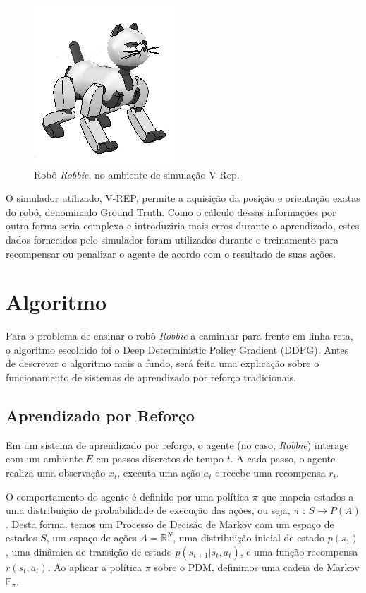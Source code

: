 \documentclass[twoside,conference,a4paper]{IEEEtran}
\begin{document}
\begin{figure}[ht!]
  \centering
  \includegraphics[width=0.5\hsize]{figuras/robbie.png}
  \caption{Robô \textit{Robbie}, no ambiente de simulação V-Rep.}
  \label{fig:robbie}
\end{figure}

O simulador utilizado, V-REP, permite a aquisição da posição e orientação exatas do robô, denominado Ground Truth. Como o cálculo dessas informações por outra forma seria complexa e introduziria mais erros durante o aprendizado, estes dados fornecidos pelo simulador foram utilizados durante o treinamento para recompensar ou penalizar o agente de acordo com o resultado de suas ações.

\section{Algoritmo}\label{sec-ddpg}

Para o problema de ensinar o robô \textit{Robbie} a caminhar para frente em linha reta, o algoritmo escolhido foi o Deep Deterministic Policy Gradient\cite{Lillicrap:2016}\cite{DDPG} (DDPG). Antes de descrever o algoritmo mais a fundo, será feita uma explicação sobre o funcionamento de sistemas de aprendizado por reforço tradicionais.

\subsection{Aprendizado por Reforço}

Em um sistema de aprendizado por reforço, o agente (no caso, \textit{Robbie}) interage com um ambiente $E$ em passos discretos de tempo $t$. A cada passo, o agente realiza uma observação $x_t$, executa uma ação $a_t$ e recebe uma recompensa $r_t$.

O comportamento do agente é definido por uma política $\pi$ que mapeia estados a uma distribuição de probabilidade de execução das ações, ou seja, $\pi$ : $S \rightarrow P(A)$. Desta forma, temos um Processo de Decisão de Markov com um espaço de estados $S$, um espaço de ações $A = \mathbb{R}^N$, uma distribuição inicial de estado $p(s_1)$, uma dinâmica de transição de estado $p(s_{t+1} | s_t, a_t)$, e uma função recompensa $r(s_t, a_t)$. Ao aplicar a política $\pi$ sobre o PDM, definimos uma cadeia de Markov $\mathbb{E}_{\pi}$.
\end{document}
